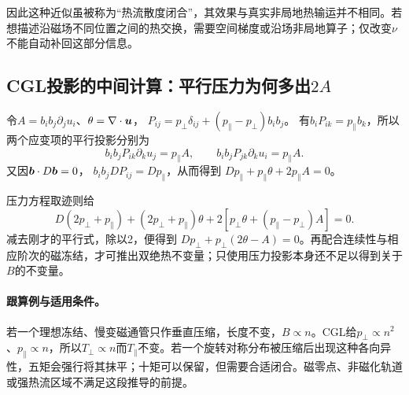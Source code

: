 因此这种近似虽被称为“热流散度闭合”，其效果与真实非局地热输运并不相同。若想描述沿磁场不同位置之间的热交换，需要空间梯度或沿场非局地算子；仅改变$\nu$不能自动补回这部分信息。\citep{Wang2015,Ng2020,Closure2026}

\subsection{CGL投影的中间计算：平行压力为何多出$2A$}
令$A=b_ib_j\partial_ju_i$、$\theta=\nabla\cdot\bm{u}$，
$P_{ij}=p_\perp\delta_{ij}+(p_\parallel-p_\perp)b_ib_j$。
有$b_iP_{ik}=p_\parallel b_k$，所以两个应变项的平行投影分别为
\begin{equation}
 b_ib_jP_{ik}\partial_ku_j=p_\parallel A,\qquad
 b_ib_jP_{jk}\partial_ku_i=p_\parallel A.
\end{equation}
又因$\bm{b}\cdot D\bm{b}=0$，
$b_ib_jDP_{ij}=Dp_\parallel$，从而得到
$Dp_\parallel+p_\parallel\theta+2p_\parallel A=0$。

压力方程取迹则给
\begin{equation}
 D(2p_\perp+p_\parallel)
 +(2p_\perp+p_\parallel)\theta
 +2[p_\perp\theta+(p_\parallel-p_\perp)A]=0.
\end{equation}
减去刚才的平行式，除以2，便得到
$Dp_\perp+p_\perp(2\theta-A)=0$。再配合连续性与相应阶次的磁冻结，才可推出双绝热不变量；只使用压力投影本身还不足以得到关于$B$的不变量。

\paragraph{跟算例与适用条件。}
若一个理想冻结、慢变磁通管只作垂直压缩，长度不变，$B\propto n$。CGL给$p_\perp\propto n^2$、$p_\parallel\propto n$，所以$T_\perp\propto n$而$T_\parallel$不变。若一个旋转对称分布被压缩后出现这种各向异性，五矩会强行将其抹平；十矩可以保留，但需要合适闭合。磁零点、非磁化轨道或强热流区域不满足这段推导的前提。
